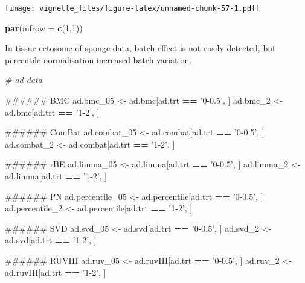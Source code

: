 \documentclass[]{book}
\newenvironment{Shaded}{\begin{snugshade}}{\end{snugshade}}
\newcommand{\KeywordTok}[1]{\textcolor[rgb]{0.13,0.29,0.53}{\textbf{#1}}}
\newcommand{\DataTypeTok}[1]{\textcolor[rgb]{0.13,0.29,0.53}{#1}}
\newcommand{\DecValTok}[1]{\textcolor[rgb]{0.00,0.00,0.81}{#1}}
\newcommand{\StringTok}[1]{\textcolor[rgb]{0.31,0.60,0.02}{#1}}
\newcommand{\CommentTok}[1]{\textcolor[rgb]{0.56,0.35,0.01}{\textit{#1}}}
\newcommand{\OperatorTok}[1]{\textcolor[rgb]{0.81,0.36,0.00}{\textbf{#1}}}
\newcommand{\NormalTok}[1]{#1}
\begin{document}
\texttt{[image: vignette\_files/figure-latex/unnamed-chunk-57-1.pdf]}

\begin{Shaded}
\begin{Highlighting}[]
\KeywordTok{par}\NormalTok{(}\DataTypeTok{mfrow =} \KeywordTok{c}\NormalTok{(}\DecValTok{1}\NormalTok{,}\DecValTok{1}\NormalTok{))}
\end{Highlighting}
\end{Shaded}

In tissue ectosome of sponge data, batch effect is not easily detected,
but percentile normalisation increased batch variation.

\begin{Shaded}
\begin{Highlighting}[]
\CommentTok{# ad data}

\NormalTok{###### BMC}
\NormalTok{ad.bmc_}\DecValTok{05}\NormalTok{ <-}\StringTok{ }\NormalTok{ad.bmc[ad.trt }\OperatorTok{==}\StringTok{ '0-0.5'}\NormalTok{, ]}
\NormalTok{ad.bmc_}\DecValTok{2}\NormalTok{ <-}\StringTok{ }\NormalTok{ad.bmc[ad.trt }\OperatorTok{==}\StringTok{ '1-2'}\NormalTok{, ]}

\NormalTok{###### ComBat}
\NormalTok{ad.combat_}\DecValTok{05}\NormalTok{ <-}\StringTok{ }\NormalTok{ad.combat[ad.trt }\OperatorTok{==}\StringTok{ '0-0.5'}\NormalTok{, ]}
\NormalTok{ad.combat_}\DecValTok{2}\NormalTok{ <-}\StringTok{ }\NormalTok{ad.combat[ad.trt }\OperatorTok{==}\StringTok{ '1-2'}\NormalTok{, ]}

\NormalTok{###### rBE}
\NormalTok{ad.limma_}\DecValTok{05}\NormalTok{ <-}\StringTok{ }\NormalTok{ad.limma[ad.trt }\OperatorTok{==}\StringTok{ '0-0.5'}\NormalTok{, ]}
\NormalTok{ad.limma_}\DecValTok{2}\NormalTok{ <-}\StringTok{ }\NormalTok{ad.limma[ad.trt }\OperatorTok{==}\StringTok{ '1-2'}\NormalTok{, ]}

\NormalTok{###### PN}
\NormalTok{ad.percentile_}\DecValTok{05}\NormalTok{ <-}\StringTok{ }\NormalTok{ad.percentile[ad.trt }\OperatorTok{==}\StringTok{ '0-0.5'}\NormalTok{, ]}
\NormalTok{ad.percentile_}\DecValTok{2}\NormalTok{ <-}\StringTok{ }\NormalTok{ad.percentile[ad.trt }\OperatorTok{==}\StringTok{ '1-2'}\NormalTok{, ]}

\NormalTok{###### SVD}
\NormalTok{ad.svd_}\DecValTok{05}\NormalTok{ <-}\StringTok{ }\NormalTok{ad.svd[ad.trt }\OperatorTok{==}\StringTok{ '0-0.5'}\NormalTok{, ]}
\NormalTok{ad.svd_}\DecValTok{2}\NormalTok{ <-}\StringTok{ }\NormalTok{ad.svd[ad.trt }\OperatorTok{==}\StringTok{ '1-2'}\NormalTok{, ]}

\NormalTok{###### RUVIII}
\NormalTok{ad.ruv_}\DecValTok{05}\NormalTok{ <-}\StringTok{ }\NormalTok{ad.ruvIII[ad.trt }\OperatorTok{==}\StringTok{ '0-0.5'}\NormalTok{, ]}
\NormalTok{ad.ruv_}\DecValTok{2}\NormalTok{ <-}\StringTok{ }\NormalTok{ad.ruvIII[ad.trt }\OperatorTok{==}\StringTok{ '1-2'}\NormalTok{, ]}
\end{Highlighting}
\end{Shaded}
\end{document}
